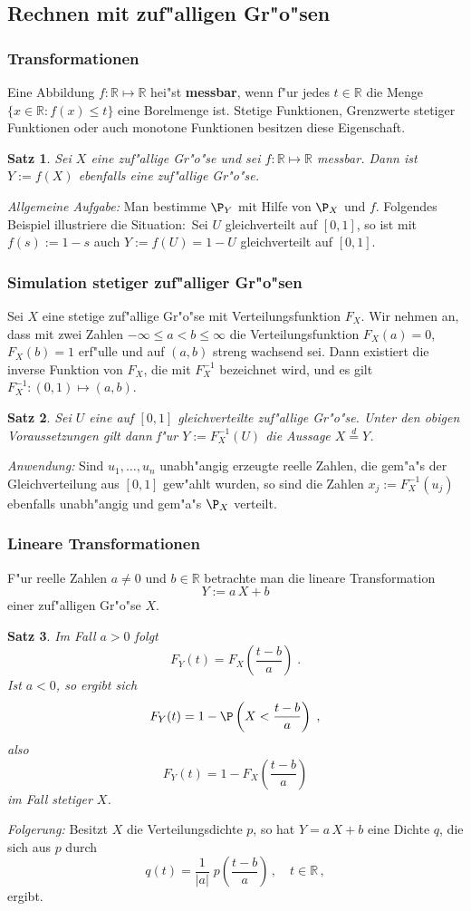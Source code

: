\documentclass[ngerman,draft,parskip=half,twoside]{scrartcl}
\newtheorem{thm}{Satz}[section]
\newcommand*{\R}{\mathbb{R}}      %
\begin{document}
\subsection{Rechnen mit zuf"alligen Gr"o"sen}
\subsubsection{Transformationen}
Eine Abbildung $f\colon\R\mapsto\R$ hei"st \textbf{messbar}, wenn f"ur jedes $t\in\R$ die
Menge $\{x\in \R : f(x)\le t\}$ eine Borelmenge ist. Stetige Funktionen, Grenzwerte stetiger
Funktionen oder auch monotone Funktionen besitzen diese Eigenschaft.
\begin{thm}
Sei $X$ eine zuf"allige Gr"o"se und sei $f\colon\R\mapsto\R$ messbar. Dann ist $Y:=f(X)$ ebenfalls
eine zuf"allige Gr"o"se.
\end{thm}
\textit{Allgemeine Aufgabe:} Man bestimme $\P_Y$ mit Hilfe von $\P_X$ und $f$.
Folgendes Beispiel illustriere die Situation$\colon$ Sei $U$ gleichverteilt auf $[0,1]$, so ist mit
$f(s):=1-s$ auch $Y:=f(U)=1-U$ gleichverteilt auf $[0,1]$.
\subsubsection{Simulation stetiger zuf"alliger Gr"o"sen}
Sei $X$ eine stetige zuf"allige Gr"o"se mit Verteilungsfunktion $F_X$. Wir nehmen an,
dass mit zwei Zahlen
$-\infty\le a<b\le\infty$ die Verteilungsfunktion $F_X(a)=0$, $F_X(b)=1$ erf"ulle  und
auf $(a,b)$ streng wachsend sei. Dann
existiert die inverse Funktion von $F_X$, die mit $F_X^{-1}$ bezeichnet wird, und es
gilt $F_X^{-1}\colon(0,1)\mapsto (a,b)$.
\begin{thm}
Sei $U$ eine auf $[0,1]$ gleichverteilte zuf"allige Gr"o"se. Unter den
obigen Voraussetzungen gilt dann f"ur $Y:=F_X^{-1}(U)$ die Aussage
$X\stackrel{d}{=} Y$.
\end{thm}
\textit{Anwendung:} Sind $u_1,\ldots,u_n$ unabh"angig erzeugte reelle Zahlen, die gem"a"s der
Gleichverteilung aus $[0,1]$ gew"ahlt wurden, so sind die Zahlen $x_j:= F_X^{-1}(u_j)$ ebenfalls unabh"angig
und gem"a"s $\P_X$ verteilt.
\subsubsection{Lineare Transformationen}
F"ur reelle Zahlen $a\not=0$ und $b\in\R$ betrachte man die lineare Transformation
$$
Y:=a\,X+ b
$$
einer zuf"alligen Gr"o"se $X$.
\begin{thm}
Im Fall $a>0$ folgt
$$
F_Y(t)=F_X\left(\frac{t-b}{a}\right)\;.
$$
Ist $a<0$, so ergibt sich
$$
F_Y(t)=1-\P\left(X<\frac{t-b}{a}\right)\;,
$$
also
$$
F_Y(t)=1-F_X\left(\frac{t-b}{a}\right)
$$
im Fall stetiger $X$.
\end{thm}
\textit{Folgerung:} Besitzt $X$ die Verteilungsdichte $p$, so hat $Y=a\,X+b$ eine Dichte $q$,
die sich aus $p$ durch
$$
q(t)=\frac{1}{|a|}\;p\left(\frac{t-b}{a}\right)\,,\quad t\in\R\,,
$$
ergibt.
\end{document}
